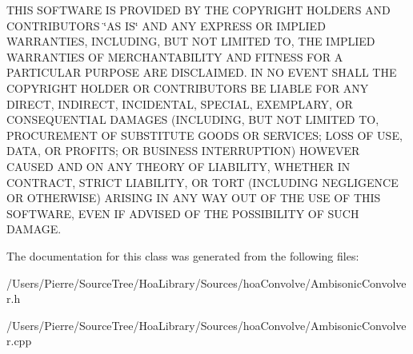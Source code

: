T\-H\-I\-S S\-O\-F\-T\-W\-A\-R\-E I\-S P\-R\-O\-V\-I\-D\-E\-D B\-Y T\-H\-E C\-O\-P\-Y\-R\-I\-G\-H\-T H\-O\-L\-D\-E\-R\-S A\-N\-D C\-O\-N\-T\-R\-I\-B\-U\-T\-O\-R\-S \char`\"{}\-A\-S I\-S\char`\"{} A\-N\-D A\-N\-Y E\-X\-P\-R\-E\-S\-S O\-R I\-M\-P\-L\-I\-E\-D W\-A\-R\-R\-A\-N\-T\-I\-E\-S, I\-N\-C\-L\-U\-D\-I\-N\-G, B\-U\-T N\-O\-T L\-I\-M\-I\-T\-E\-D T\-O, T\-H\-E I\-M\-P\-L\-I\-E\-D W\-A\-R\-R\-A\-N\-T\-I\-E\-S O\-F M\-E\-R\-C\-H\-A\-N\-T\-A\-B\-I\-L\-I\-T\-Y A\-N\-D F\-I\-T\-N\-E\-S\-S F\-O\-R A P\-A\-R\-T\-I\-C\-U\-L\-A\-R P\-U\-R\-P\-O\-S\-E A\-R\-E D\-I\-S\-C\-L\-A\-I\-M\-E\-D. I\-N N\-O E\-V\-E\-N\-T S\-H\-A\-L\-L T\-H\-E C\-O\-P\-Y\-R\-I\-G\-H\-T H\-O\-L\-D\-E\-R O\-R C\-O\-N\-T\-R\-I\-B\-U\-T\-O\-R\-S B\-E L\-I\-A\-B\-L\-E F\-O\-R A\-N\-Y D\-I\-R\-E\-C\-T, I\-N\-D\-I\-R\-E\-C\-T, I\-N\-C\-I\-D\-E\-N\-T\-A\-L, S\-P\-E\-C\-I\-A\-L, E\-X\-E\-M\-P\-L\-A\-R\-Y, O\-R C\-O\-N\-S\-E\-Q\-U\-E\-N\-T\-I\-A\-L D\-A\-M\-A\-G\-E\-S (I\-N\-C\-L\-U\-D\-I\-N\-G, B\-U\-T N\-O\-T L\-I\-M\-I\-T\-E\-D T\-O, P\-R\-O\-C\-U\-R\-E\-M\-E\-N\-T O\-F S\-U\-B\-S\-T\-I\-T\-U\-T\-E G\-O\-O\-D\-S O\-R S\-E\-R\-V\-I\-C\-E\-S; L\-O\-S\-S O\-F U\-S\-E, D\-A\-T\-A, O\-R P\-R\-O\-F\-I\-T\-S; O\-R B\-U\-S\-I\-N\-E\-S\-S I\-N\-T\-E\-R\-R\-U\-P\-T\-I\-O\-N) H\-O\-W\-E\-V\-E\-R C\-A\-U\-S\-E\-D A\-N\-D O\-N A\-N\-Y T\-H\-E\-O\-R\-Y O\-F L\-I\-A\-B\-I\-L\-I\-T\-Y, W\-H\-E\-T\-H\-E\-R I\-N C\-O\-N\-T\-R\-A\-C\-T, S\-T\-R\-I\-C\-T L\-I\-A\-B\-I\-L\-I\-T\-Y, O\-R T\-O\-R\-T (I\-N\-C\-L\-U\-D\-I\-N\-G N\-E\-G\-L\-I\-G\-E\-N\-C\-E O\-R O\-T\-H\-E\-R\-W\-I\-S\-E) A\-R\-I\-S\-I\-N\-G I\-N A\-N\-Y W\-A\-Y O\-U\-T O\-F T\-H\-E U\-S\-E O\-F T\-H\-I\-S S\-O\-F\-T\-W\-A\-R\-E, E\-V\-E\-N I\-F A\-D\-V\-I\-S\-E\-D O\-F T\-H\-E P\-O\-S\-S\-I\-B\-I\-L\-I\-T\-Y O\-F S\-U\-C\-H D\-A\-M\-A\-G\-E. 

The documentation for this class was generated from the following files\-:\begin{DoxyCompactItemize}
\item 
/\-Users/\-Pierre/\-Source\-Tree/\-Hoa\-Library/\-Sources/hoa\-Convolve/Ambisonic\-Convolver.\-h\item 
/\-Users/\-Pierre/\-Source\-Tree/\-Hoa\-Library/\-Sources/hoa\-Convolve/Ambisonic\-Convolver.\-cpp\end{DoxyCompactItemize}
